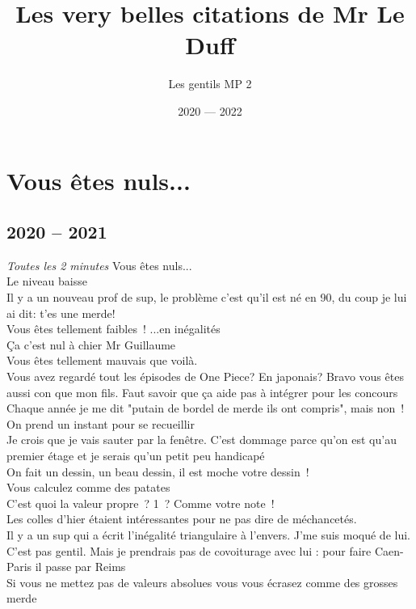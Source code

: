\documentclass[french, a4paper, openany]{book}
\title{\huge{\sc Les very belles citations de Mr Le Duff}}
\author{\LARGE{Les gentils MP 2}}
\date{\Large{2020 — 2022}}
\begin{document}
 \maketitle

\section*{Vous êtes nuls...}

	\subsection*{2020 -- 2021}

	\noindent \emph{Toutes les 2 minutes} \og Vous êtes nuls... \fg \\
	\og Le niveau baisse \fg \\
	\og Il y a un nouveau prof de sup, le problème c'est qu'il est né en 90, du coup je lui ai dit: t'es une merde! \fg \\
	\og Vous êtes tellement faibles~! ...en inégalités \fg \\
	\og Ça c'est nul à chier Mr Guillaume \fg \\
	\og Vous êtes tellement mauvais que voilà. \fg \\
	\og Vous avez regardé tout les épisodes de One Piece? En japonais? Bravo vous êtes aussi con que mon fils. Faut savoir que ça aide pas à intégrer pour les concours \fg \\
	\og Chaque année je me dit "putain de bordel de merde ils ont compris", mais non~! \fg \\
	\og On prend un instant pour se recueillir \fg \\
	\og Je crois que je vais sauter par la fenêtre. C'est dommage parce qu'on est qu'au premier étage et je serais qu'un petit peu handicapé \fg \\
	\og On fait un dessin, un beau dessin, il est moche votre dessin~! \fg \\
	\og Vous calculez comme des patates \fg \\
	\og C'est quoi la valeur propre~? 1~? Comme votre note~! \fg \\
	\og Les colles d'hier étaient intéressantes pour ne pas dire de méchancetés. \fg \\
	\og Il y a un sup qui a écrit l'inégalité triangulaire à l'envers. J'me suis moqué de lui. C'est pas gentil. Mais je prendrais pas de covoiturage avec lui : pour faire Caen-Paris il passe par Reims \fg \\
	\og Si vous ne mettez pas de valeurs absolues vous vous écrasez comme des grosses merde \fg \\
\end{document}
